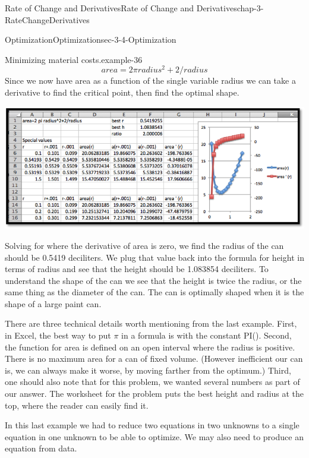 \documentclass[oneside,10pt,]{book}
\numberwithin{equation}{section}
\begin{document}
\begin{chapterptx}{Rate of Change and Derivatives}{}{Rate of Change and Derivatives}{}{}{chap-3-RateChangeDerivatives}
\begin{sectionptx}{Optimization}{}{Optimization}{}{}{sec-3-4-Optimization}
\begin{example}{Minimizing material costs.}{example-36}
%
\begin{equation*}
area=2 \pi radius^2+2 /radius
\end{equation*}
\hypertarget{p-1226}{}%
Since we now have area as a function of the single variable radius we can take a derivative to find the critical point, then find the optimal shape.%
\begin{sidebyside}{1}{0.05}{0.05}{0}%
\begin{sbspanel}{0.9}%
\includegraphics[width=1\linewidth]{images/sec3-4-8.png}
\end{sbspanel}%
\end{sidebyside}%
\par
\hypertarget{p-1227}{}%
Solving for where the derivative of area is zero, we find the radius of the can should be 0.5419 deciliters.  We plug that value back into the formula for height in terms of radius and see that the height should be 1.083854 deciliters.  To understand the shape of the can we see that the height is twice the radius, or the same thing as the diameter of the can.  The can is optimally shaped when it is the shape of a large paint can.%
\end{example}
\hypertarget{p-1228}{}%
There are three technical details worth mentioning from the last example.  First, in Excel, the best way to put \(\pi\) in a formula is with the constant PI(). Second, the function for area is defined on an open interval where the radius is positive.  There is no maximum area for a can of fixed volume.  (However inefficient our can is, we can always make it worse, by moving farther from the optimum.)  Third, one should also note that for this problem, we wanted several numbers as part of our answer.  The worksheet for the problem puts the best height and radius at the top, where the reader can easily find it.%
\par
\hypertarget{p-1229}{}%
In this last example we had to reduce two equations in two unknowns to a single equation in one unknown to be able to optimize.  We may also need to produce an equation from data.%

\end{sectionptx}
\end{chapterptx}
\end{document}
